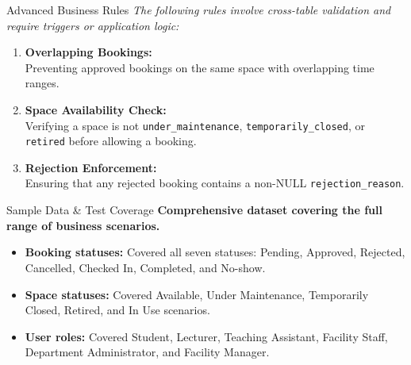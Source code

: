 \begin{frame}{Advanced Business Rules}
    \textit{The following rules involve cross-table validation and require triggers or application logic:}
    \vspace{0.5cm}
    
    \begin{enumerate}
        \item \textbf{Overlapping Bookings:}\\ 
        Preventing approved bookings on the same space with overlapping time ranges.
        \vspace{0.3cm}
        \item \textbf{Space Availability Check:}\\ 
        Verifying a space is not \texttt{under\_maintenance}, \texttt{temporarily\_closed}, or \texttt{retired} before allowing a booking.
        \vspace{0.3cm}
        \item \textbf{Rejection Enforcement:}\\ 
        Ensuring that any rejected booking contains a non-NULL \texttt{rejection\_reason}.
    \end{enumerate}
\end{frame}

\begin{frame}{Sample Data \& Test Coverage }
    \textbf{Comprehensive dataset covering the full range of business scenarios.}
    \vspace{0.3cm}
    
    \begin{itemize}
        \item \textbf{Booking statuses:} Covered all seven statuses: Pending, Approved, Rejected, Cancelled, Checked In, Completed, and No-show.
        \vspace{0.2cm}
        \item \textbf{Space statuses:} Covered Available, Under Maintenance, Temporarily Closed, Retired, and In Use scenarios.
        \vspace{0.2cm}
        \item \textbf{User roles:} Covered Student, Lecturer, Teaching Assistant, Facility Staff, Department Administrator, and Facility Manager.
    \end{itemize}
\end{frame}

